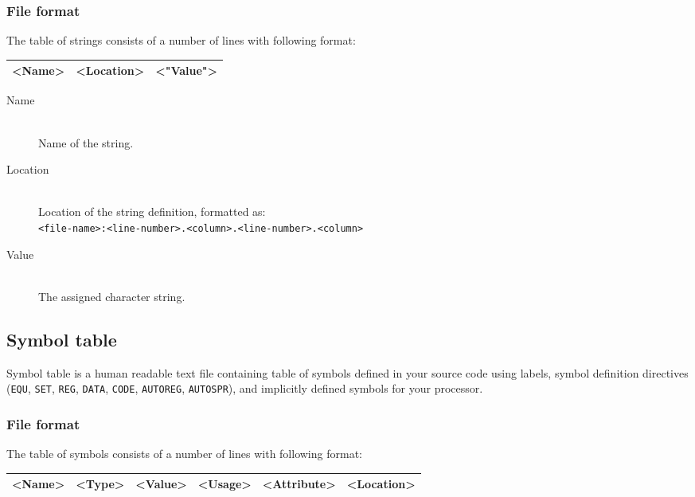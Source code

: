         \subsubsection{File format}
            The table of strings consists of a number of lines with following format:

            \begin{tabular}{|ccc|}
                \hline
                <Name> & <Location> & <"Value"> \\\hline
            \end{tabular}

            \begin{description}
                \item[Name]~\\
                    Name of the string.
                \item[Location]~\\
                    Location of the string definition, formatted as:\\
                    \texttt{<file-name>:<line-number>.<column>.<line-number>.<column>}
                \item[Value]~\\
                    The assigned character string.
            \end{description}

    \subsection{Symbol table}
        Symbol table is a human readable text file containing table of symbols defined in your source code using labels, symbol definition directives (\texttt{EQU}, \texttt{SET}, \texttt{REG}, \texttt{DATA}, \texttt{CODE}, \texttt{AUTOREG}, \texttt{AUTOSPR}), and implicitly defined symbols for your processor.

        \subsubsection{File format}
            The table of symbols consists of a number of lines with following format:

            \begin{tabular}{|cccccc|}
                \hline
                <Name> & <Type> & <Value> & <Usage> & <Attribute> & <Location> \\\hline
            \end{tabular}

